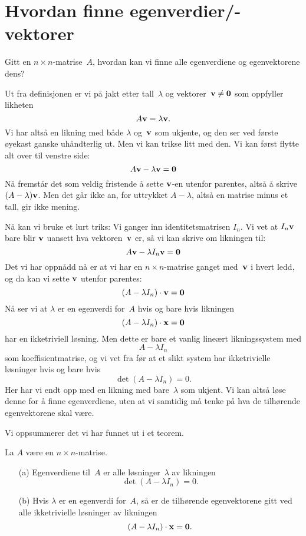 \section*{Hvordan finne egenverdier/-vektorer}

Gitt en $n \times n$-matrise~$A$, hvordan kan vi finne alle
egenverdiene og egenvektorene dens?

Ut fra definisjonen er vi på jakt etter tall~$\lambda$ og
vektorer~$\mathbf{v} \ne \mathbf{0}$ som oppfyller likheten
\[
A \mathbf{v} = \lambda \mathbf{v}.
\]
Vi har altså en likning med både $\lambda$ og~$\mathbf{v}$ som ukjente, og
den ser ved første øyekast ganske uhåndterlig ut.  Men vi kan trikse
litt med den.  Vi kan først flytte alt over til venstre side:
\[
A \mathbf{v} - \lambda \mathbf{v} = \mathbf{0}
\]
Nå fremstår det som veldig fristende å sette $\mathbf{v}$-en utenfor
parentes, altså å skrive $(A - \lambda) \mathbf{v}$.  Men det går ikke an,
for uttrykket $A - \lambda$, altså en matrise minus et tall, gir ikke
mening.

Nå kan vi bruke et lurt triks: Vi ganger inn identitetsmatrisen $I_n$.
Vi vet at $I_n \mathbf{v}$ bare blir $\mathbf{v}$ uansett hva vektoren~$\mathbf{v}$
er, så vi kan skrive om likningen til:
\[
A \mathbf{v} - \lambda I_n \mathbf{v} = \mathbf{0}
\]
Det vi har oppnådd nå er at vi har en $n \times n$-matrise ganget
med~$\mathbf{v}$ i hvert ledd, og da kan vi sette $\mathbf{v}$ utenfor parentes:
\[
(A - \lambda I_n) \cdot \mathbf{v} = \mathbf{0}
\]
Nå ser vi at $\lambda$ er en egenverdi for~$A$ hvis og bare hvis
likningen
\[
(A - \lambda I_n) \cdot \mathbf{x} = \mathbf{0}
\]
har en ikketriviell løsning.  Men dette er bare et vanlig lineært
likningssystem med
\[
A - \lambda I_n
\]
som koeffisientmatrise, og vi vet fra før %
at et slikt system har ikketrivielle løsninger hvis og bare hvis
\[
\det (A - \lambda I_n) = 0.
\]
Her har vi endt opp med en likning med bare~$\lambda$ som ukjent.  Vi
kan altså løse denne for å finne egenverdiene, uten at vi samtidig må
tenke på hva de tilhørende egenvektorene skal være.

Vi oppsummerer det vi har funnet ut i et teorem.

\begin{thm}
\label{thm:finne-egenverdier}
La $A$ være en $n \times n$-matrise.
\begin{enumerate}
\item[(a)] Egenverdiene til~$A$ er alle løsninger~$\lambda$ av
likningen
\[
\det (A - \lambda I_n) = 0.
\]
\item[(b)] Hvis $\lambda$ er en egenverdi for~$A$, så er de tilhørende
egenvektorene gitt ved alle ikketrivielle løsninger av likningen
\[
(A - \lambda I_n) \cdot \mathbf{x} = \mathbf{0}.
\]
\end{enumerate}
\end{thm}

